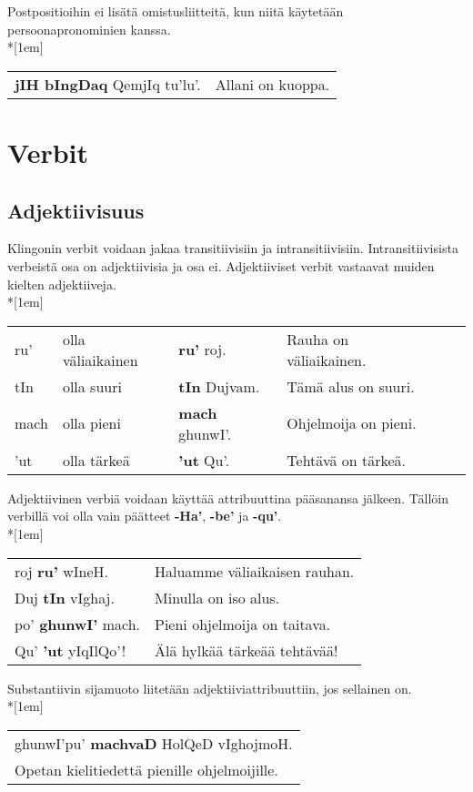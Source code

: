 \documentclass{book}
\begin{document}
Postpositioihin ei lisätä omistusliitteitä, kun niitä käytetään persoonapronominien kanssa.\\*[1em]
\begin{tabular}{l l}
    \textbf{jIH bIngDaq} QemjIq tu'lu'. & Allani on kuoppa.
\end{tabular}

\chapter{Verbit}

\section{Adjektiivisuus}

Klingonin verbit voidaan jakaa transitiivisiin ja intransitiivisiin.
Intransitiivisista verbeistä osa on adjektiivisia ja osa ei.
Adjektiiviset verbit vastaavat muiden kielten adjektiiveja.
\\*[1em]
\begin{tabular}{Bl Il | l l}
    ru' & olla väliaikainen & \textbf{ru'} roj. & Rauha on väliaikainen. \\
    tIn & olla suuri & \textbf{tIn} Dujvam. & Tämä alus on suuri. \\
    mach & olla pieni & \textbf{mach} ghunwI'. & Ohjelmoija on pieni. \\
    'ut & olla tärkeä & \textbf{'ut} Qu'. & Tehtävä on tärkeä. \\
\end{tabular}

Adjektiivinen verbiä voidaan käyttää attribuuttina pääsanansa jälkeen.
Tällöin verbillä voi olla vain päätteet \textbf{-Ha'}, \textbf{-be'} ja \textbf{-qu'}.\\*[1em]
\begin{tabular}{l l}
    roj \textbf{ru'} wIneH. & Haluamme väliaikaisen rauhan. \\
    Duj \textbf{tIn} vIghaj. & Minulla on iso alus. \\
    po' \textbf{ghunwI'} mach. & Pieni ohjelmoija on taitava. \\
    Qu' \textbf{'ut} yIqIlQo'! & Älä hylkää tärkeää tehtävää! \\
\end{tabular}

Substantiivin sijamuoto liitetään adjektiiviattribuuttiin, jos sellainen on.\\*[1em]
\begin{tabular}{l}
    ghunwI'pu' \textbf{machvaD} HolQeD vIghojmoH. \\
    Opetan kielitiedettä pienille ohjelmoijille. \\ 
\end{tabular}
\end{document}

